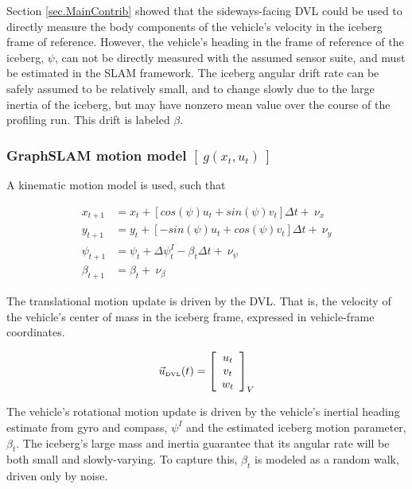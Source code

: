 Section \ref{sec.MainContrib} showed that the sideways-facing DVL could be used to directly measure the body components of the vehicle's velocity in the iceberg frame of reference. However, the vehicle's heading in the frame of reference of the iceberg, $\psi$, can not be directly measured with the assumed sensor suite, and must be estimated in the SLAM framework. The iceberg angular drift rate can be safely assumed to be relatively small, and to change slowly due to the large inertia of the iceberg, but may have nonzero mean value over the course of the profiling run. This drift is labeled $\beta$. 

\subsubsection{GraphSLAM motion model $\left[~g\left(x_t,u_t\right)~\right]$ }

A kinematic motion model is used, such that

\begin{align}
x_{t+1} &= x_t + \left[cos(\psi) u_t + sin(\psi)v_t\right]\Delta t +~ \nu_x\\
y_{t+1} &= y_t + \left[-sin(\psi) u_t + cos(\psi)v_t\right]\Delta t + ~\nu_y \\
\psi_{t+1}    &= \psi_{t} + \Delta\psi_t^I - \beta_t\Delta t + ~\nu_\psi \\
\beta_{t +1}   &= \beta_{t} + ~\nu_\beta
\end{align}


The translational motion update is driven by the DVL. That is, the velocity of the vehicle's center of mass in the iceberg frame, expressed in vehicle-frame coordinates. 

\begin{equation}
\vec{u}_\text{\tiny{DVL}}(t) = 
                    \left[\begin{array}{c}
                     u_t \\ v_t \\ w_t 
                     \end{array}\right]_V
\end{equation}

The vehicle's rotational motion update is driven by the vehicle's inertial heading estimate from gyro and compass, $\psi^I$ and the estimated iceberg motion parameter, $\beta_t$.  The iceberg's large mass and inertia guarantee that its angular rate will be both small and slowly-varying. To capture this, $\beta_t$ is modeled as a random walk, driven only by noise.

